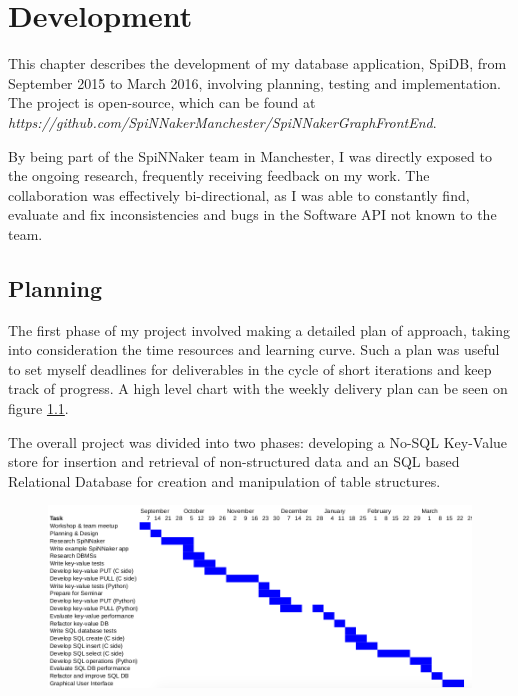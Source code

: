 \chapter{Development}
\label{cha:development}

This chapter describes the development of my database application, SpiDB, from September 2015 to March 2016, involving planning, testing and implementation. The project is open-source, which can be found at
\textit{https://github.com/SpiNNakerManchester/SpiNNakerGraphFrontEnd}.

By being part of the SpiNNaker team in Manchester, I was directly exposed to the ongoing research, frequently receiving feedback on my work. The collaboration was effectively bi-directional, as I was able to constantly find, evaluate and fix inconsistencies and bugs in the Software API not known to the team.

\section{Planning}
The first phase of my project involved making a detailed plan of approach, taking into consideration the time resources and learning curve. Such a plan was useful to set myself deadlines for deliverables in the cycle of short iterations and keep track of progress. A high level chart with the weekly delivery plan can be seen on figure \ref{fig:plan}.

The overall project was divided into two phases: developing a No-SQL Key-Value store for insertion and retrieval of non-structured data and an SQL based Relational Database for creation and manipulation of table structures. 

\begin{figure}
\center
  \includegraphics[width=1.3\linewidth, natwidth=950, natheight=410]{images/plan.png}
  \label{fig:plan}
\end{figure}

